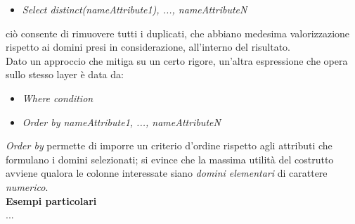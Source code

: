 \documentclass{article}
\begin{document}
\begin{itemize}[label={ }, leftmargin=1cm]
    \itemsep0em
    \item \textit{Select distinct(nameAttribute1), ..., nameAttributeN}
\end{itemize}
ciò consente di rimuovere tutti i duplicati, che abbiano medesima valorizzazione rispetto ai domini presi in considerazione, all'interno del risultato.\vspace*{14pt}\\
Dato un approccio che mitiga su un certo rigore, un'altra espressione che opera sullo stesso layer è data da:
\begin{itemize}[label={ }, leftmargin=1cm]
    \itemsep0em
    \item \textit{Where condition}
    \item \textit{Order by nameAttribute1, ..., nameAttributeN}
\end{itemize}
\textit{Order by} permette di imporre un criterio d'ordine rispetto agli attributi che formulano i domini selezionati; si evince che la massima utilità del costrutto avviene qualora le colonne interessate siano \textit{domini elementari} di carattere \textit{numerico}.\vspace*{7pt}\\
\textbf{Esempi particolari}\\
...
\end{document}

